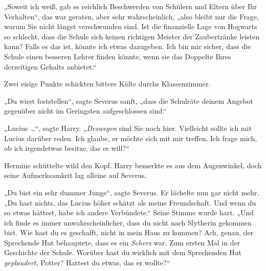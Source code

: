 „Soweit ich weiß, gab es reichlich Beschwerden von Schülern und Eltern über Ihr Verhalten“, das war geraten, aber sehr wahrscheinlich, „also bleibt nur die Frage, warum Sie nicht längst verschwunden sind. Ist die finanzielle Lage von Hogwarts so schlecht, dass die Schule sich keinen richtigen Meister der Zaubertränke leisten kann? Falls es das ist, könnte ich etwas dazugeben. Ich bin mir sicher, dass die Schule einen besseren Lehrer finden könnte, wenn sie das Doppelte Ihres derzeitigen Gehalts anbietet.“

Zwei eisige Punkte schickten bittere Kälte durchs Klassenzimmer.

„Du wirst feststellen“, sagte Severus sanft, „dass die Schulräte deinem Angebot gegenüber nicht im Geringsten aufgeschlossen sind.“

„Lucius …“, sagte Harry.
„\emph{Deswegen} sind Sie noch hier. Vielleicht sollte ich mit Lucius darüber reden. Ich glaube, er möchte sich mit mir treffen. Ich frage mich, ob ich irgendetwas besitze, das er will?“

Hermine schüttelte wild den Kopf. Harry bemerkte es aus dem Augenwinkel, doch seine Aufmerksamkeit lag alleine auf Severus.

„Du bist ein sehr dummer Junge“, sagte Severus. Er lächelte nun gar nicht mehr.
„Du hast nichts, das Lucius höher schätzt als meine Freundschaft. Und wenn du so etwas hättest, habe ich andere Verbündete.“ Seine Stimme wurde hart.
„Und ich finde es immer unwahrscheinlicher, dass du nicht nach Slytherin gekommen bist. Wie hast du es geschafft, nicht in mein Haus zu kommen? Ach, genau, der Sprechende Hut behauptete, dass es ein \emph{Scherz} war. Zum ersten Mal in der Geschichte der Schule. Worüber hast du wirklich mit dem Sprechenden Hut \emph{geplaudert}, Potter? Hattest du etwas, das er wollte?“

